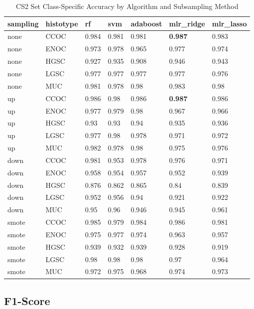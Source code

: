 \documentclass[
]{report}
\begin{document}
\begin{table}

\caption{\label{tab:cs2-accuracy-class-table}CS2 Set Class-Specific Accuracy by Algorithm and Subsampling Method}
\centering
\begin{tabular}[t]{l|l|l|l|l|l|l}
\hline
sampling & histotype & rf & svm & adaboost & mlr\_ridge & mlr\_lasso\\
\hline
none & CCOC & 0.984 & 0.981 & 0.981 & \textbf{0.987} & 0.983\\
\hline
none & ENOC & 0.973 & 0.978 & 0.965 & 0.977 & 0.974\\
\hline
none & HGSC & 0.927 & 0.935 & 0.908 & 0.946 & 0.943\\
\hline
none & LGSC & 0.977 & 0.977 & 0.977 & 0.977 & 0.976\\
\hline
none & MUC & 0.981 & 0.978 & 0.98 & 0.983 & 0.98\\
\hline
up & CCOC & 0.986 & 0.98 & 0.986 & \textbf{0.987} & 0.986\\
\hline
up & ENOC & 0.977 & 0.979 & 0.98 & 0.967 & 0.966\\
\hline
up & HGSC & 0.93 & 0.93 & 0.94 & 0.935 & 0.936\\
\hline
up & LGSC & 0.977 & 0.98 & 0.978 & 0.971 & 0.972\\
\hline
up & MUC & 0.982 & 0.978 & 0.98 & 0.975 & 0.976\\
\hline
down & CCOC & 0.981 & 0.953 & 0.978 & 0.976 & 0.971\\
\hline
down & ENOC & 0.958 & 0.954 & 0.957 & 0.952 & 0.939\\
\hline
down & HGSC & 0.876 & 0.862 & 0.865 & 0.84 & 0.839\\
\hline
down & LGSC & 0.952 & 0.956 & 0.94 & 0.921 & 0.922\\
\hline
down & MUC & 0.95 & 0.96 & 0.946 & 0.945 & 0.961\\
\hline
smote & CCOC & 0.985 & 0.979 & 0.984 & 0.986 & 0.981\\
\hline
smote & ENOC & 0.975 & 0.977 & 0.974 & 0.963 & 0.957\\
\hline
smote & HGSC & 0.939 & 0.932 & 0.939 & 0.928 & 0.919\\
\hline
smote & LGSC & 0.98 & 0.98 & 0.98 & 0.97 & 0.964\\
\hline
smote & MUC & 0.972 & 0.975 & 0.968 & 0.974 & 0.973\\
\hline
\end{tabular}
\end{table}

\hypertarget{f1-score-2}{%
\subsection{F1-Score}\label{f1-score-2}}
\end{document}
